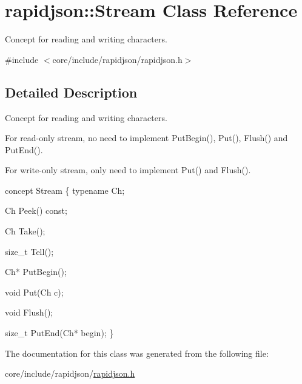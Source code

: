 \hypertarget{classrapidjson_1_1Stream}{}\section{rapidjson\+:\+:Stream Class Reference}
\label{classrapidjson_1_1Stream}


Concept for reading and writing characters.  




{\ttfamily \#include $<$core/include/rapidjson/rapidjson.\+h$>$}



\subsection{Detailed Description}
Concept for reading and writing characters. 

For read-\/only stream, no need to implement Put\+Begin(), Put(), Flush() and Put\+End().

For write-\/only stream, only need to implement Put() and Flush().


\begin{DoxyCode}
concept Stream \{
    \textcolor{keyword}{typename} Ch;    

    Ch Peek() \textcolor{keyword}{const};

    Ch Take();

    \textcolor{keywordtype}{size\_t} Tell();

    Ch* PutBegin();

    \textcolor{keywordtype}{void} Put(Ch c);

    \textcolor{keywordtype}{void} Flush();

    \textcolor{keywordtype}{size\_t} PutEnd(Ch* begin);
\}
\end{DoxyCode}
 

The documentation for this class was generated from the following file\+:\begin{DoxyCompactItemize}
\item 
core/include/rapidjson/\hyperlink{rapidjson_8h}{rapidjson.\+h}\end{DoxyCompactItemize}
